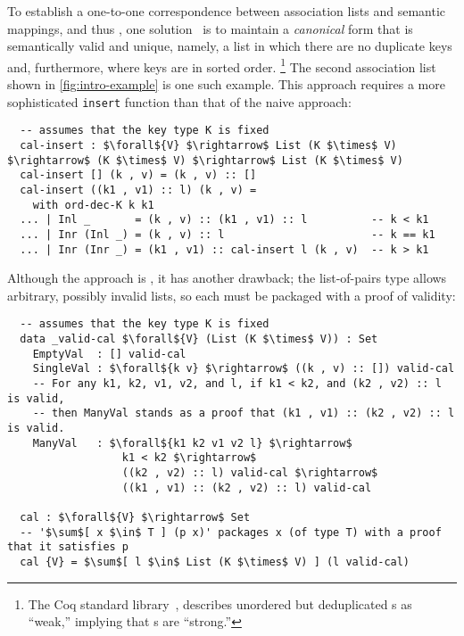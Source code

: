 To establish a one-to-one correspondence between association lists and semantic mappings, and thus \Extensional, one solution~\citep{FMapList} is to maintain a \emph{canonical}
%
form that is semantically valid and unique, namely, a list in which there are no duplicate keys and, furthermore, where keys are in sorted order.%
%
\footnote{\hspace{0.01in}%
%
The Coq standard library~\citep{FMapInterface}, describes unordered but deduplicated \sal{}s as ``weak,'' implying that \cal{}s are ``strong.''
%
}
%
The second association list shown in \autoref{fig:intro-example} is one such example.
%
This approach requires a more sophisticated \texttt{insert} function than that of the naive \sal{} approach:
\begin{lstlisting}
  -- assumes that the key type K is fixed
  cal-insert : $\forall${V} $\rightarrow$ List (K $\times$ V) $\rightarrow$ (K $\times$ V) $\rightarrow$ List (K $\times$ V)
  cal-insert [] (k , v) = (k , v) :: []
  cal-insert ((k1 , v1) :: l) (k , v) =
    with ord-dec-K k k1
  ... | Inl _       = (k , v) :: (k1 , v1) :: l          -- k < k1
  ... | Inr (Inl _) = (k , v) :: l                       -- k == k1
  ... | Inr (Inr _) = (k1 , v1) :: cal-insert l (k , v)  -- k > k1
\end{lstlisting}


Although the \cal{} approach is \extensional, it has another drawback; the list-of-pairs type allows arbitrary, possibly invalid lists, so each \cal{} must be packaged with a proof of validity:
\begin{lstlisting}
  -- assumes that the key type K is fixed
  data _valid-cal $\forall${V} (List (K $\times$ V)) : Set
    EmptyVal  : [] valid-cal
    SingleVal : $\forall${k v} $\rightarrow$ ((k , v) :: []) valid-cal
    -- For any k1, k2, v1, v2, and l, if k1 < k2, and (k2 , v2) :: l is valid,
    -- then ManyVal stands as a proof that (k1 , v1) :: (k2 , v2) :: l is valid.
    ManyVal   : $\forall${k1 k2 v1 v2 l} $\rightarrow$
                  k1 < k2 $\rightarrow$
                  ((k2 , v2) :: l) valid-cal $\rightarrow$
                  ((k1 , v1) :: (k2 , v2) :: l) valid-cal

  cal : $\forall${V} $\rightarrow$ Set
  -- '$\sum$[ x $\in$ T ] (p x)' packages x (of type T) with a proof that it satisfies p
  cal {V} = $\sum$[ l $\in$ List (K $\times$ V) ] (l valid-cal)
\end{lstlisting}

